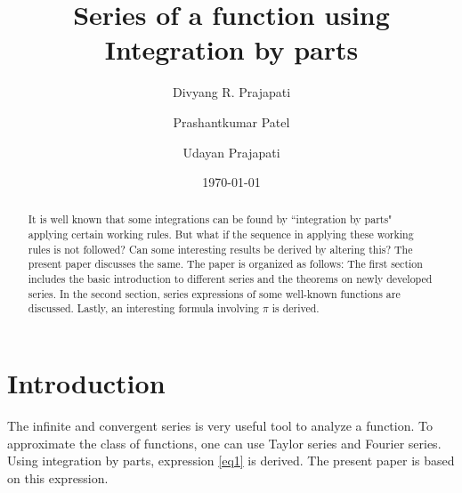 \documentclass{amsart}
\theoremstyle{definition}
\theoremstyle{remark}
\numberwithin{equation}{section}
\begin{document}
\title{Series of a function using Integration by parts}

\author{Divyang R. Prajapati}
\address{Department of Physics, St. Xavier's college (Autonomous),  Ahmedabad, India.}

\author{ Prashantkumar Patel}
\address{Department of  Mathematics, St. Xavier's college (Autonomous), Ahmedabad, India.}

\author{ Udayan Prajapati}
\address{Department of  Mathematics, St. Xavier's college (Autonomous), Ahmedabad, India.}


\date{\today }



\begin{abstract}
It is well known that some integrations can be found by ``integration by parts" applying certain working rules. But what if the sequence in applying these working rules is not followed? Can some interesting results be derived by altering this? The present paper discusses the same. The paper is organized as follows: The first section includes the basic introduction to different series and the theorems on newly developed series. In the second section, series expressions of some well-known functions are discussed. Lastly, an interesting formula involving $\pi$ is derived.
\end{abstract}

\maketitle


\section*{Introduction}
The infinite and convergent series is very useful tool to analyze a function. To approximate the class of functions, one can use Taylor series and Fourier series. Using integration by parts, expression \eqref{eq1} is derived. The present paper is based on this expression.
\end{document}

